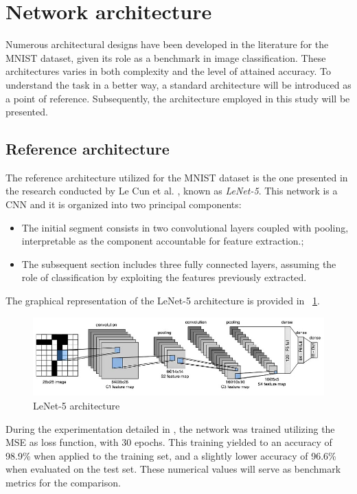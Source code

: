 \section{Network architecture}

Numerous architectural designs have been developed in the literature for the MNIST dataset, given its role as a benchmark in image classification. These architectures varies in both complexity and the level of attained accuracy. To understand the task in a better way, a standard architecture will be introduced as a point of reference. Subsequently, the architecture employed in this study will be presented.

\subsection{Reference architecture}

The reference architecture utilized for the MNIST dataset is the one presented in the research conducted by Le Cun et al. \cite{LeCun:90}, known as \textit{LeNet-5}. This network is a CNN and it is organized into two principal components:

\begin{itemize}
	\item The initial segment consists in two convolutional layers coupled with pooling, interpretable as the component accountable for feature extraction.;
	\item The subsequent section includes three fully connected layers, assuming the role of classification by exploiting the features previously extracted.
\end{itemize}

The graphical representation of the LeNet-5 architecture is provided in \Fig~\ref{fig:lenet5}.

\begin{figure}[h]
	\centering
	\includegraphics[width=0.8\linewidth]{ImageFiles/NetArchitecture/lenet5}
	\caption{LeNet-5 architecture \cite{LeNet5}}
	\label{fig:lenet5}
\end{figure}

During the experimentation detailed in \cite{LeCun:90}, the network was trained utilizing the MSE as loss function, with 30 epochs. This training yielded to an accuracy of 98.9\% when applied to the training set, and a slightly lower accuracy of 96.6\% when evaluated on the test set. These numerical values will serve as benchmark metrics for the comparison.

